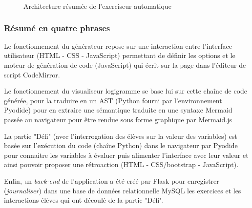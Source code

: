 \documentclass[11pt,a4paper]{article}
\begin{document}
\begin{minipage}{\textwidth}
\begin{figure}[H]
\begin{adjustbox}{max width=\textwidth}
\end{adjustbox}
\caption{Architecture résumée de l'exerciseur automatique}
\label{fig:architecture}
\end{figure}

\subsubsection{Résumé en quatre phrases}
Le fonctionnement du générateur repose sur une interaction entre l'interface utilisateur (HTML - CSS - JavaScript) permettant de définir les options et le moteur de génération de code (JavaScript) qui écrit sur la page dans l'éditeur de script CodeMirror. \\
\par Le fonctionnement du visualiseur logigramme se base lui sur cette chaîne de code générée, pour la traduire en un AST (Python fourni par l'environnement Pyodide) pour en extraire une sémantique traduite en une syntaxe Mermaid passée au navigateur pour être rendue sous forme graphique par Mermaid.js  \\
\par La partie "Défi" (avec l'interrogation des élèves sur la valeur des variables) est basée sur l'exécution du code (chaîne Python) dans le navigateur par Pyodide pour connaitre les variables à évaluer puis alimenter l'interface avec leur valeur et ainsi pouvoir proposer une rétroaction (HTML - CSS/bootstrap - JavaScript).\\
\par
Enfin, un \textit{back-end} de l'application a été créé par Flask pour enregistrer (\textit{journaliser}) dans une base de données relationnelle MySQL les exercices et les interactions élèves qui ont découlé de la partie "Défi".
\end{minipage}
\end{document}
